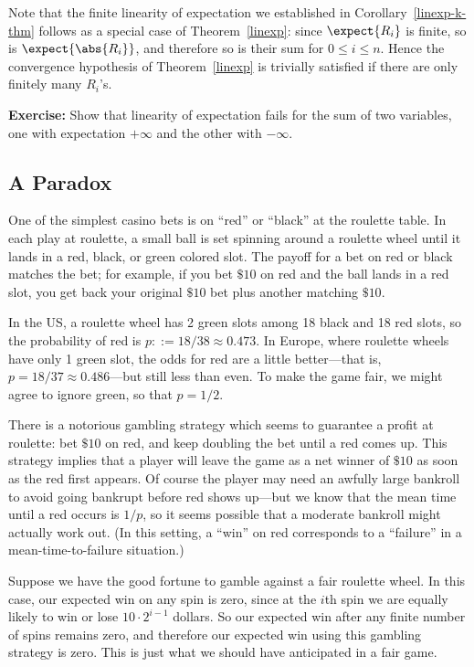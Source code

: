 \begin{editingnotes}
Note that the finite linearity of expectation we established in
Corollary~\ref{linexp-k-thm} follows as a special case of
Theorem~\ref{linexp}: since $\expect{R_i}$ is finite, so is
$\expect{\abs{R_i}}$, and therefore so is their sum for $0 \leq i \leq n$.
Hence the convergence hypothesis of Theorem~\ref{linexp} is trivially
satisfied if there are only finitely many $R_i$'s.

\textbf{Exercise:} Show that linearity of expectation fails for the sum of
two variables, one with expectation $+\infty$ and the other with
$-\infty$.

\subsection{A Paradox}
One of the simplest casino bets is on ``red'' or ``black'' at the roulette
table.  In each play at roulette, a small ball is set spinning around a
roulette wheel until it lands in a red, black, or green colored slot.
The payoff for a bet on red or black matches the bet; for example, if you bet
$\$10$ on red and the ball lands in a red slot, you get back your original
$\$10$ bet plus another matching $\$10$.

In the US, a roulette wheel has 2 green slots among 18 black and 18 red
slots, so the probability of red is $p::= 18/38 \approx 0.473$.  In
Europe, where roulette wheels have only 1 green slot, the odds for red
are a little better---that is, $p = 18/37 \approx 0.486$---but still less
than even.  To make the game fair, we might agree to ignore green, so that
$p = 1/2$.

There is a notorious gambling strategy which seems to guarantee a profit
at roulette: bet $\$10$ on red, and keep doubling the bet until a red
comes up.  This strategy implies that a player will leave the game as a
net winner of $\$10$ as soon as the red first appears.  Of course the
player may need an awfully large bankroll to avoid going bankrupt before
red shows up---but we know that the mean time until a red occurs is $1/p$,
so it seems possible that a moderate bankroll might actually work out.
(In this setting, a ``win'' on red corresponds to a ``failure'' in a
mean-time-to-failure situation.)

Suppose we have the good fortune to gamble against a fair roulette wheel.
In this case, our expected win on any spin is zero, since at the $i$th
spin we are equally likely to win or lose $10 \cdot 2^{i-1}$ dollars.  So
our expected win after any finite number of spins remains zero, and
therefore our expected win using this gambling strategy is zero.  This is
just what we should have anticipated in a fair game.


\end{editingnotes}
